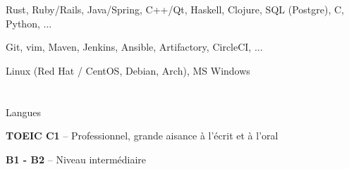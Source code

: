 \documentclass[a4paper, 10pt]{article}
\begin{document}
{Rust, Ruby/Rails, Java/Spring, C++/Qt, Haskell, Clojure, SQL (Postgre), C, Python, ...}

{Git, vim, Maven, Jenkins, Ansible, Artifactory, CircleCI, ...}

{Linux (Red Hat / CentOS, Debian, Arch), MS Windows}


\section{\faComment[regular]}{Langues}


{\textbf{TOEIC C1} -- Professionnel, grande aisance à l’écrit et à l’oral}

{\textbf{B1 - B2} -- Niveau intermédiaire}
\end{document}
